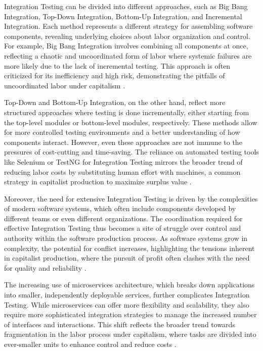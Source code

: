 \begin{refsection}
Integration Testing can be divided into different approaches, such as Big Bang Integration, Top-Down Integration, Bottom-Up Integration, and Incremental Integration. Each method represents a different strategy for assembling software components, revealing underlying choices about labor organization and control. For example, Big Bang Integration involves combining all components at once, reflecting a chaotic and uncoordinated form of labor where systemic failures are more likely due to the lack of incremental testing. This approach is often criticized for its inefficiency and high risk, demonstrating the pitfalls of uncoordinated labor under capitalism \cite[pp.~78-82]{pressman2005software}.

Top-Down and Bottom-Up Integration, on the other hand, reflect more structured approaches where testing is done incrementally, either starting from the top-level modules or bottom-level modules, respectively. These methods allow for more controlled testing environments and a better understanding of how components interact. However, even these approaches are not immune to the pressures of cost-cutting and time-saving. The reliance on automated testing tools like Selenium or TestNG for Integration Testing mirrors the broader trend of reducing labor costs by substituting human effort with machines, a common strategy in capitalist production to maximize surplus value \cite[pp.~180-185]{fuchs2014digital}.

Moreover, the need for extensive Integration Testing is driven by the complexities of modern software systems, which often include components developed by different teams or even different organizations. The coordination required for effective Integration Testing thus becomes a site of struggle over control and authority within the software production process. As software systems grow in complexity, the potential for conflict increases, highlighting the tensions inherent in capitalist production, where the pursuit of profit often clashes with the need for quality and reliability \cite[pp.~150-154]{huws2014labor}.

The increasing use of microservices architecture, which breaks down applications into smaller, independently deployable services, further complicates Integration Testing. While microservices can offer more flexibility and scalability, they also require more sophisticated integration strategies to manage the increased number of interfaces and interactions. This shift reflects the broader trend towards fragmentation in the labor process under capitalism, where tasks are divided into ever-smaller units to enhance control and reduce costs \cite[pp.~215-218]{marx2008capital}.


\end{refsection}
